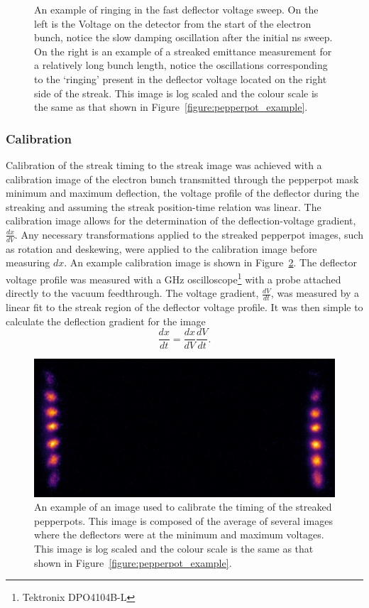 \begin{figure}
    \center
    
    \caption[Streak deflector voltage oscillations.]{An example of ringing in the fast deflector voltage sweep. On the left is the Voltage on the detector from the start of the electron bunch, notice the slow damping oscillation after the initial \unit[10]{ns} sweep. On the right is an example of a streaked emittance measurement for a relatively long bunch length, notice the oscillations corresponding to the `ringing' present in the deflector voltage located on the right side of the streak. This image is log scaled and the colour scale is the same as that shown in Figure~\ref{figure:pepperpot_example}.}
    \label{figure:ringing}
\end{figure}

\subsubsection{Calibration}
Calibration of the streak timing to the streak image was achieved with a calibration image of the electron bunch transmitted through the pepperpot mask minimum and maximum deflection, the voltage profile of the deflector during the streaking and assuming the streak position-time relation was linear.
The calibration image allows for the determination of the deflection-voltage gradient, $\frac{dx}{dV}$.
Any necessary transformations applied to the streaked pepperpot images, such as rotation and deskewing, were applied to the calibration image before measuring $dx$.
An example calibration image is shown in Figure~\ref{figure:example_calibration}.
The deflector voltage profile was measured with a \unit[1]{GHz} oscilloscope\footnote{Tektronix DPO4104B-L} with a probe attached directly to the vacuum feedthrough.
The voltage gradient, $\frac{dV}{dt}$, was measured by a linear fit to the streak region of the deflector voltage profile.
It was then simple to calculate the  deflection gradient for the image
\begin{equation}
\frac{dx}{dt} = \frac{dx}{dV} \frac{dV}{dt}.
\end{equation}

\begin{figure}
    \center
    \includegraphics[width=0.5\linewidth]{part2/Figs/example_calibration.jpeg}
    \caption[Streaked pepperpot calibration image.]{An example of an image used to calibrate the timing of the streaked pepperpots.
    This image is composed of the average of several images where the deflectors were at the minimum and maximum voltages. This image is log scaled and the colour scale is the same as that shown in Figure~\ref{figure:pepperpot_example}.}
    \label{figure:example_calibration}
\end{figure}

